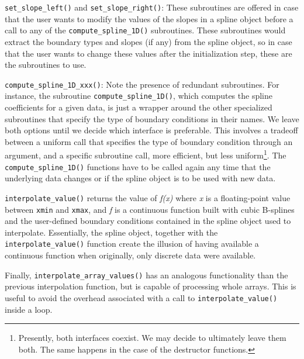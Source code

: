 \documentclass[]{report}   %
\begin{document}
\verb+set_slope_left()+ and \verb+set_slope_right()+: These subroutines are offered in case that the user wants to modify the values of the slopes in a spline object before a call to any of the \verb+compute_spline_1D()+ subroutines. These subroutines would extract the boundary types and slopes (if any) from the spline object, so in case that the user wants to change these values after the initialization step, these are the subroutines to use.

\verb+compute_spline_1D_xxx()+: Note the presence of redundant subroutines. For instance, the subroutine \verb+compute_spline_1D()+, which computes the spline coefficients for a given data, is just a wrapper around the other specialized subroutines that specify the type of boundary conditions in their names. We leave both options until we decide which interface is preferable. This involves a tradeoff between a uniform call that specifies the type of boundary condition through an argument, and a specific subroutine call, more efficient, but less uniform\footnote{Presently, both interfaces coexist. We may decide to ultimately leave them both. The same happens in the case of the destructor functions.}. The \verb+compute_spline_1D()+ functions have to be called again any time that the underlying data changes or if the spline object is to be used with new data. 

\verb+interpolate_value()+ returns the value of \emph{f(x)} where \emph{x} is a floating-point value between \verb+xmin+ and \verb+xmax+, and \emph{f} is a continuous function built with cubic B-splines and the user-defined boundary conditions contained in the spline object used to interpolate. Essentially, the spline object, together with the \verb+interpolate_value()+ function create the illusion of having available a continuous function when originally, only discrete data were available.

Finally, \verb+interpolate_array_values()+ has an analogous functionality than the previous interpolation function, but is capable of processing whole arrays. This is useful to avoid the overhead associated with a call to \verb+interpolate_value()+ inside a loop.
\end{document}
